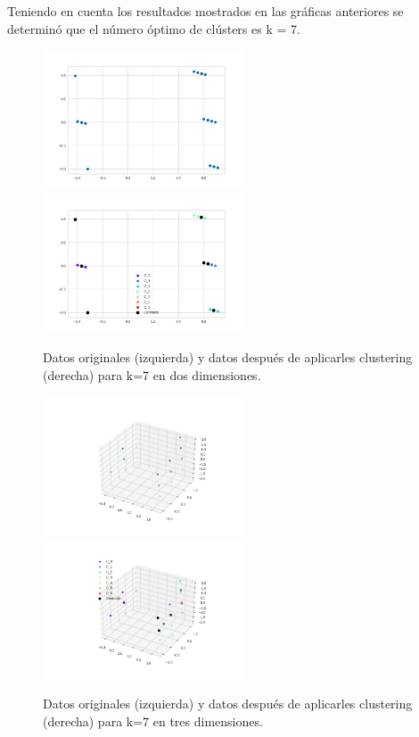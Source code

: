 \documentclass[10pt, a4paper]{article}
\begin{document}
    	Teniendo en cuenta los resultados mostrados en las gr\'aficas anteriores se determin\'o que el n\'umero \'optimo de cl\'usters es k = 7.
    	
    	\begin{figure}[H]
    		\centering
    		\includegraphics[width = 6cm]{Original_Data_2d.png}
    		\includegraphics[width = 6cm]{Clustered_Data_2d_k7_seed45.png}
    		\caption{Datos originales (izquierda) y datos despu\'es de aplicarles clustering (derecha) para k=7 en dos dimensiones.}
    	\end{figure}
    	
    	\begin{figure}[H]
    		\centering
    		\includegraphics[width = 6cm]{Original_Data_3d.png}
    		\includegraphics[width = 6cm]{Clustered_Data_3d_k7_seed45.png}
    		\caption{Datos originales (izquierda) y datos despu\'es de aplicarles clustering (derecha) para k=7 en tres dimensiones.}
    	\end{figure}
    	
\end{document}

